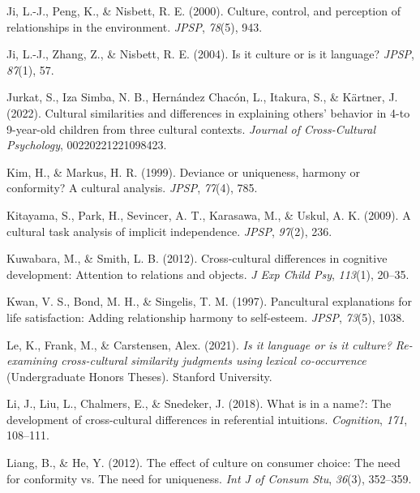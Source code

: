\documentclass[
  man,floatsintext]{apa6}
\newlength{\cslhangindent}
\newlength{\cslentryspacingunit} %
\newenvironment{CSLReferences}[2] %
 {%
  \setlength{\parindent}{0pt}
  \ifodd #1
  \let\oldpar\par
  \def\par{\hangindent=\cslhangindent\oldpar}
  \fi
  \setlength{\parskip}{#2\cslentryspacingunit}
 }%
 {}
\begin{document}
\begin{CSLReferences}{1}{0}
\leavevmode{}%
Ji, L.-J., Peng, K., \& Nisbett, R. E. (2000). Culture, control, and perception of relationships in the environment. \emph{JPSP}, \emph{78}(5), 943.

\leavevmode{}%
Ji, L.-J., Zhang, Z., \& Nisbett, R. E. (2004). Is it culture or is it language? \emph{JPSP}, \emph{87}(1), 57.

\leavevmode{}%
Jurkat, S., Iza Simba, N. B., Hernández Chacón, L., Itakura, S., \& Kärtner, J. (2022). Cultural similarities and differences in explaining others' behavior in 4-to 9-year-old children from three cultural contexts. \emph{Journal of Cross-Cultural Psychology}, 00220221221098423.

\leavevmode{}%
Kim, H., \& Markus, H. R. (1999). Deviance or uniqueness, harmony or conformity? A cultural analysis. \emph{JPSP}, \emph{77}(4), 785.

\leavevmode{}%
Kitayama, S., Park, H., Sevincer, A. T., Karasawa, M., \& Uskul, A. K. (2009). A cultural task analysis of implicit independence. \emph{JPSP}, \emph{97}(2), 236.

\leavevmode{}%
Kuwabara, M., \& Smith, L. B. (2012). Cross-cultural differences in cognitive development: Attention to relations and objects. \emph{J Exp Child Psy}, \emph{113}(1), 20--35.

\leavevmode{}%
Kwan, V. S., Bond, M. H., \& Singelis, T. M. (1997). Pancultural explanations for life satisfaction: Adding relationship harmony to self-esteem. \emph{JPSP}, \emph{73}(5), 1038.

\leavevmode{}%
Le, K., Frank, M., \& Carstensen, Alex. (2021). \emph{Is it language or is it culture? Re-examining cross-cultural similarity judgments using lexical co-occurrence} (Undergraduate Honors Theses). Stanford University.

\leavevmode{}%
Li, J., Liu, L., Chalmers, E., \& Snedeker, J. (2018). What is in a name?: The development of cross-cultural differences in referential intuitions. \emph{Cognition}, \emph{171}, 108--111.

\leavevmode{}%
Liang, B., \& He, Y. (2012). The effect of culture on consumer choice: The need for conformity vs. The need for uniqueness. \emph{Int J of Consum Stu}, \emph{36}(3), 352--359.


\end{CSLReferences}
\end{document}

